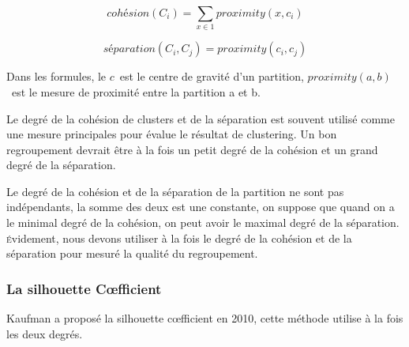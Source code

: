 $$cohésion(C_{i}) = \sum_{x\in1} proximity(x, c_{i})$$

$$séparation(C_{i},C_{j}) = proximity(c_{i}, c_{j})$$


Dans les formules, le \(c\)\ est le centre de gravité d'un partition, \(proximity(a,b)\)\ est le mesure de proximité entre la partition a et b.

Le degré de la cohésion de clusters et de la séparation est souvent utilisé comme une mesure principales pour évalue le résultat de clustering. Un bon regroupement devrait être à la fois un petit degré de la cohésion et un grand degré de la séparation.

Le degré de la cohésion et de la séparation de la partition ne sont pas indépendants, la somme des deux est une constante, on suppose que quand on a le minimal degré de la cohésion, on peut avoir le maximal degré de la séparation. \textsc{é}videment, nous devons utiliser à la fois le degré de la cohésion et de la séparation pour mesuré la qualité du regroupement.

\subsubsection{La silhouette C\oe fficient}

Kaufman a proposé la silhouette c\oe fficient en 2010, cette méthode utilise à la fois les deux degrés.

